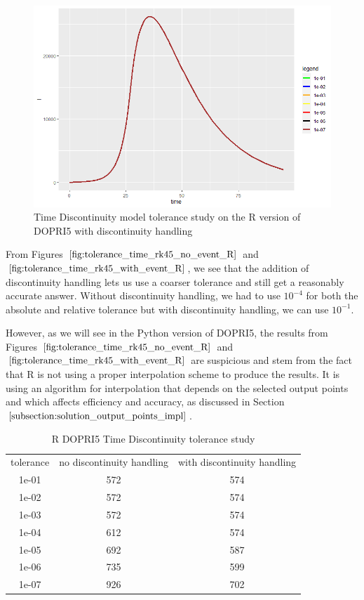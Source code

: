 \begin{figure}[H]
\centering
\includegraphics[width=0.7\linewidth]{./figures/tolerance_time_rk45_with_event_R}
\caption{Time Discontinuity model tolerance study on the R version of DOPRI5 with discontinuity handling}
\label{fig:tolerance_time_rk45_with_event_R}
\end{figure}

From Figures $\ref{fig:tolerance_time_rk45_no_event_R}$ and $\ref{fig:tolerance_time_rk45_with_event_R}$, we see that the addition of discontinuity handling lets us use a coarser tolerance and still get a reasonably accurate answer. Without discontinuity handling, we had to use $10^{-4}$ for both the absolute and relative tolerance but with discontinuity handling, we can use $10^{-1}$. 

However, as we will see in the Python version of DOPRI5, the results from Figures $\ref{fig:tolerance_time_rk45_no_event_R}$ and $\ref{fig:tolerance_time_rk45_with_event_R}$ are suspicious and stem from the fact that R is not using a proper interpolation scheme to produce the results. It is using an algorithm for interpolation that depends on the selected output points and which affects efficiency and accuracy, as discussed in Section $\ref{subsection:solution_output_points_impl}$. 

\begin{table}[H]
\caption {R DOPRI5 Time Discontinuity tolerance study} \label{tab:tolerance_time_discontinuity_rk45_R} 
\begin{center}
\begin{tabular}{ c c c }
tolerance & no discontinuity handling & with discontinuity handling\\ 
1e-01 & 572 & 574 \\
1e-02 & 572 & 574 \\
1e-03 & 572 & 574 \\
1e-04 & 612 & 574 \\
1e-05 & 692 & 587 \\
1e-06 & 735 & 599 \\
1e-07 & 926 & 702 \\
\end{tabular}
\end{center}
\end{table}

